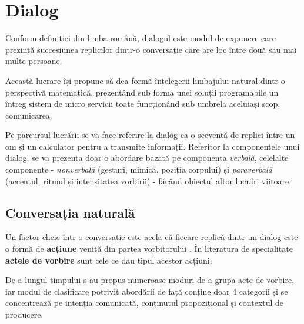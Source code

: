 \chapter{Dialog}

Conform definiției din limba română, dialogul este modul de expunere care prezintă succesiunea replicilor dintr-o conversație care are loc între două sau mai multe persoane.

Această lucrare își propune să dea formă înțelegerii limbajului natural dintr-o perspectivă matematică, prezentând sub forma unei soluții programabile un întreg sistem de micro servicii toate funcționând sub umbrela aceluiași scop, comunicarea.

Pe parcursul lucrării se va face referire la dialog ca o secvență de replici între un om și un calculator pentru a transmite informații.
Referitor la componentele unui dialog, se va prezenta doar o abordare bazată pe componenta \textit{verbală}, celelalte componente - \textit{nonverbală} (gesturi, mimică, poziția corpului) și \textit{paraverbală} (accentul, ritmul și intensitatea vorbirii) - făcând obiectul altor lucrări viitoare.


\section{Conversația naturală}

Un factor cheie într-o conversație este acela că fiecare replică dintr-un dialog este o formă de \textbf{acțiune} venită din partea vorbitorului \cite{witt1953}. În literatura de specialitate \textbf{actele de vorbire} sunt cele ce dau tipul acestor acțiuni.

De-a lungul timpului s-au propus numeroase moduri de a grupa acte de vorbire, iar modul de clasificare potrivit abordării de față conține doar 4 categorii și se concentrează pe intenția comunicată, conținutul propozițional și contextul de producere.

